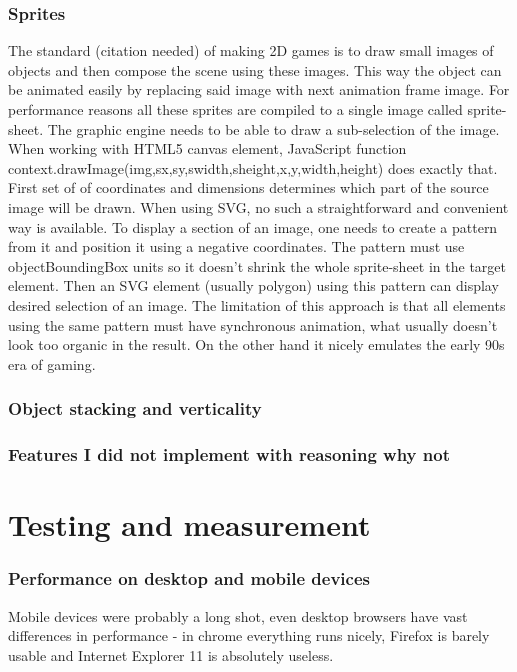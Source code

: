 \documentclass[11pt,oneside, final]{fithesis2}
\begin{document}
\subsection{Sprites}
The standard (citation needed) of making 2D games is to draw small images of objects and then compose the scene using these images. This way the object can be animated easily by replacing said image with next animation frame image. For performance reasons all these sprites are compiled to a single image called sprite-sheet. The graphic engine needs to be able to draw a sub-selection of the image. When working with HTML5 canvas element, JavaScript function context.drawImage(img,sx,sy,swidth,sheight,x,y,width,height) does exactly that. First set of of coordinates and dimensions determines which part of the source image will be drawn. When using SVG, no such a straightforward and convenient way is available. To display a section of an image, one needs to create a pattern from it and position it using a negative coordinates. The pattern must use objectBoundingBox units so it doesn't shrink the whole sprite-sheet in the target element. Then an SVG element (usually polygon) using this pattern can display desired selection of an image.
The limitation of this approach is that all elements using the same pattern must have synchronous animation, what usually doesn't look too organic in the result. On the other hand it nicely emulates the early 90s era of gaming.


\subsection{Object stacking and verticality}

\subsection{Features I did not implement with reasoning why not}

\chapter{Testing and measurement}
\label{testing}
\subsection{Performance on desktop and mobile devices}
Mobile devices were probably a long shot, even desktop browsers have vast differences in performance - in chrome everything runs nicely, Firefox is barely usable and Internet Explorer 11 is absolutely useless.
\end{document}

